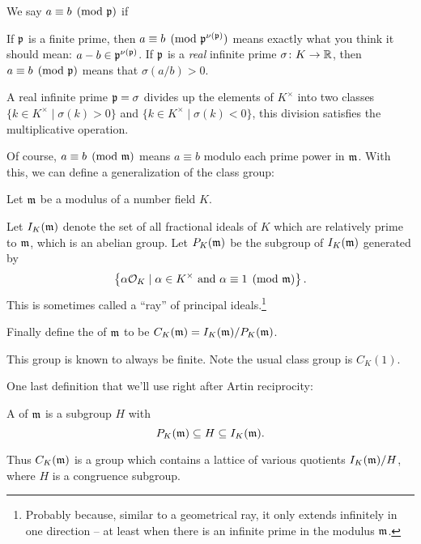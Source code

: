 We say $a \equiv b \pmod{\mathfrak p}$ if
\begin{itemize}
	\ii If $\mathfrak p$ is a finite prime, then $a \equiv b \pmod{\mathfrak p^{\nu(\mathfrak p)}}$
	means exactly what you think it should mean:
	$a-b \in \mathfrak p^{\nu(\mathfrak p)}$.
	\ii If $\mathfrak p$ is a \emph{real} infinite prime $\sigma \colon K \to \mathbb R$, then
	$a \equiv b \pmod{\mathfrak p}$ means that $\sigma(a/b) > 0$.
\end{itemize}

\begin{moral}
	A real infinite prime $\mathfrak p = \sigma$ divides up the elements of $K^\times$
	into two classes
	$\{k \in K^\times \mid \sigma(k)>0 \}$
	and
	$\{k \in K^\times \mid \sigma(k)<0 \}$,
	this division satisfies the multiplicative operation.
\end{moral}

Of course, $a \equiv b \pmod{\mathfrak m}$ means $a \equiv b$
modulo each prime power in $\mathfrak m$.
With this, we can define a generalization of the class group:
\begin{definition}
	Let $\mathfrak m$ be a modulus of a number field $K$.
	\begin{itemize}
		\ii Let $I_K(\mathfrak m)$ denote the set of all fractional ideals of $K$
		which are relatively prime to $\mathfrak m$, which is an abelian group.
		\ii Let $P_K(\mathfrak m)$ be the subgroup of $I_K(\mathfrak m)$ generated by
		\[
			\left\{
				\alpha \mathcal O_K
				\mid
				\alpha \in K^\times \text{ and }
				\alpha \equiv 1 \pmod{\mathfrak m}
			\right\}.
		\]
		This is sometimes called a ``ray'' of principal
		ideals.\footnote{Probably because, similar to a geometrical ray, it only
			extends infinitely in one direction -- at least when there is an
		infinite prime in the modulus $\mathfrak m$.}
	\end{itemize}
	Finally define the  of $\mathfrak m$
	to be $C_K(\mathfrak m) = I_K(\mathfrak m) / P_K(\mathfrak m)$.
\end{definition}
This group is known to always be finite.
Note the usual class group is $C_K(1)$.

One last definition that we'll use right after Artin reciprocity:
\begin{definition}
	A  of $\mathfrak m$ is a subgroup $H$ with
	\[ P_K(\mathfrak m) \subseteq H \subseteq I_K(\mathfrak m). \]
\end{definition}
Thus $C_K(\mathfrak m)$ is a group which contains a lattice of various
quotients $I_K(\mathfrak m) / H$, where $H$ is a congruence subgroup.

